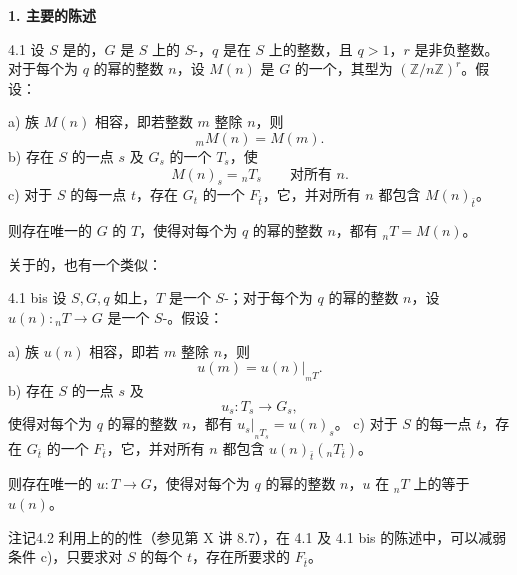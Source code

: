 \textbf{1. 主要的陈述}
\begin{SGAresult}{}{4.1}
设 $S$ 是的，$G$ 是 $S$ 上的 $S$-，$q$ 是在 $S$ 上的整数，且 $q>1$，$r$ 是非负整数。对于每个为 $q$ 的幂的整数 $n$，设 $M(n)$ 是 $G$ 的一个，其型为 $(\mathbb Z/n\mathbb Z)^r$。假设：

a) 族 $M(n)$ 相容，即若整数 $m$ 整除 $n$，则
\[{}_mM(n)=M(m).\]
b) 存在 $S$ 的一点 $s$ 及 $G_s$ 的一个 $T_s$，使
\[M(n)_s={}_nT_s\qquad\text{对所有 }n.\]
c) 对于 $S$ 的每一点 $t$，存在 $G_t$ 的一个 $F_{\bar t}$，它，并对所有 $n$ 都包含 $M(n)_{\bar t}$。

则存在唯一的 $G$ 的 $T$，使得对每个为 $q$ 的幂的整数 $n$，都有 ${}_nT=M(n)$。
\end{SGAresult}
关于的，也有一个类似：
\begin{SGAresult}{}{4.1 bis}
设 $S,G,q$ 如上，$T$ 是一个 $S$-；对于每个为 $q$ 的幂的整数 $n$，设 $u(n):{}_nT\to G$ 是一个 $S$-。假设：

a) 族 $u(n)$ 相容，即若 $m$ 整除 $n$，则
\[u(m)=u(n)|_{{}_mT}.\]
b) 存在 $S$ 的一点 $s$ 及
\[u_s:T_s\longrightarrow G_s,\]
使得对每个为 $q$ 的幂的整数 $n$，都有 $u_s|_{{}_nT_s}=u(n)_s$。
c) 对于 $S$ 的每一点 $t$，存在 $G_{\bar t}$ 的一个 $F_{\bar t}$，它，并对所有 $n$ 都包含 $u(n)_{\bar t}({}_nT_{\bar t})$。

则存在唯一的 $u:T\to G$，使得对每个为 $q$ 的幂的整数 $n$，$u$ 在 ${}_nT$ 上的等于 $u(n)$。
\end{SGAresult}
\begin{SGAresult}{注记}{4.2}
利用上的的性（参见第 X 讲 8.7），在 4.1 及 4.1 bis 的陈述中，可以减弱条件 c)，只要求对 $S$ 的每个 $t$，存在所要求的 $F_{\bar t}$。
\end{SGAresult}
